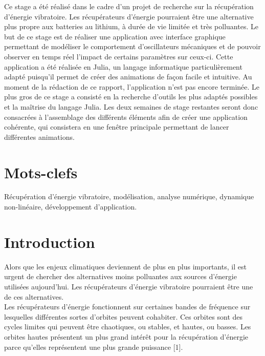 \documentclass[a4paper, french, 12pt, titlepage]{article}
\begin{document}
Ce stage a été réalisé dans le cadre d'un projet de recherche sur la récupération d'énergie vibratoire. 
Les récupérateurs d'énergie pourraient être une alternative plus propre aux batteries au lithium, à durée de vie limitée et très polluantes. Le but de ce stage est de réaliser une application avec interface graphique permettant de modéliser le comportement d'oscillateurs mécaniques et de pouvoir observer en temps réel l'impact de certains paramètres sur ceux-ci. 
Cette application a été réalisée en Julia, un langage informatique particulièrement adapté puisqu'il permet de créer des animations de façon facile et intuitive. Au moment de la rédaction de ce rapport, l'application n'est pas encore terminée. 
Le plus gros de ce stage a consisté en la recherche d'outils les plus adaptés possibles et la maîtrise du langage Julia. Les deux semaines de stage restantes seront donc consacrées à l'assemblage des différents éléments afin de créer une application cohérente, qui consistera en une fenêtre principale permettant de lancer différentes animations. 



\section*{Mots-clefs}

Récupération d'énergie vibratoire, modélisation, analyse numérique, dynamique non-linéaire, développement d'application.

\newpage 

\tableofcontents

\newpage 



\section{Introduction}

Alors que les enjeux climatiques deviennent de plus en plus importants, il est urgent de chercher des alternatives moins polluantes aux sources d'énergie utilisées aujourd'hui.
Les récupérateurs d'énergie vibratoire pourraient être une de ces alternatives. \\ 

Les récupérateurs d'énergie fonctionnent sur certaines bandes de fréquence sur lesquelles différentes sortes d'orbites peuvent cohabiter. 
Ces orbites sont des cycles limites qui peuvent être chaotiques, ou stables, et hautes, ou basses. 
Les orbites hautes présentent un plus grand intérêt pour la récupération d'énergie parce qu'elles représentent une plus grande puissance [1]. \\ 
\end{document}
